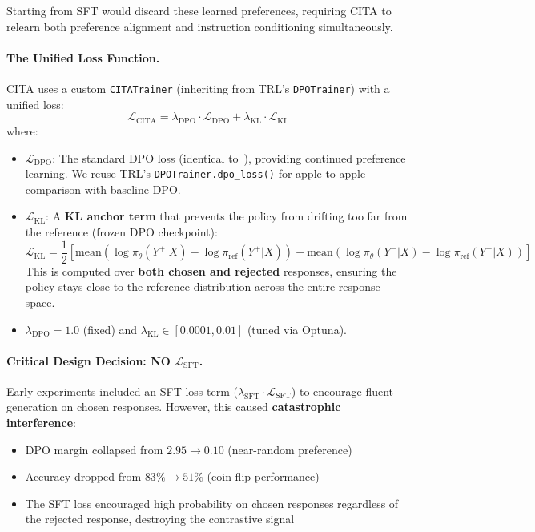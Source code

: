 Starting from SFT would discard these learned preferences, requiring CITA to relearn both preference alignment and instruction conditioning simultaneously.

\paragraph{The Unified Loss Function.} CITA uses a custom \texttt{CITATrainer} (inheriting from TRL's \texttt{DPOTrainer}) with a unified loss:
\begin{equation*}
    \mathcal{L}_{\text{CITA}} = \lambda_{\text{DPO}} \cdot \mathcal{L}_{\text{DPO}} + \lambda_{\text{KL}} \cdot \mathcal{L}_{\text{KL}}
\end{equation*}
where:
\begin{itemize}[leftmargin=*]
    \item $\mathcal{L}_{\text{DPO}}$: The standard DPO loss (identical to~\cite{rafailov2023direct}), providing continued preference learning. We reuse TRL's \texttt{DPOTrainer.dpo\_loss()} for apple-to-apple comparison with baseline DPO.

    \item $\mathcal{L}_{\text{KL}}$: A \textbf{KL anchor term} that prevents the policy from drifting too far from the reference (frozen DPO checkpoint):
    \begin{equation*}
        \mathcal{L}_{\text{KL}} = \frac{1}{2} \left[ \text{mean}\left(\log \pi_\theta(Y^+ | X) - \log \pi_{\text{ref}}(Y^+ | X)\right) + \text{mean}\left(\log \pi_\theta(Y^- | X) - \log \pi_{\text{ref}}(Y^- | X)\right) \right]
    \end{equation*}
    This is computed over \textbf{both chosen and rejected} responses, ensuring the policy stays close to the reference distribution across the entire response space.

    \item $\lambda_{\text{DPO}} = 1.0$ (fixed) and $\lambda_{\text{KL}} \in [0.0001, 0.01]$ (tuned via Optuna).
\end{itemize}

\paragraph{Critical Design Decision: NO $\mathcal{L}_{\text{SFT}}$.} Early experiments included an SFT loss term ($\lambda_{\text{SFT}} \cdot \mathcal{L}_{\text{SFT}}$) to encourage fluent generation on chosen responses. However, this caused \textbf{catastrophic interference}:
\begin{itemize}[leftmargin=*]
    \item DPO margin collapsed from $2.95 \rightarrow 0.10$ (near-random preference)
    \item Accuracy dropped from $83\% \rightarrow 51\%$ (coin-flip performance)
    \item The SFT loss encouraged high probability on chosen responses regardless of the rejected response, destroying the contrastive signal
\end{itemize}

